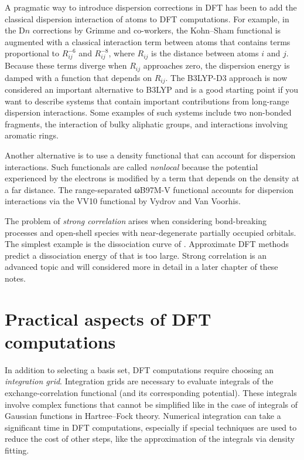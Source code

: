 \documentclass[../Main/chem371-notes.tex]{subfiles}
\begin{document}
A pragmatic way to introduce dispersion corrections in DFT has been to add the classical dispersion interaction of atoms to DFT computations.
For example, in the D$n$ corrections by Grimme and co-workers, the Kohn--Sham functional is augmented with a classical interaction term between atoms that contains terms proportional to $R_{ij}^{-6}$ and $R_{ij}^{-8}$, where $R_{ij}$ is the distance between atoms $i$ and $j$.
Because these terms diverge when $R_{ij}$ approaches zero, the dispersion energy is damped with a function that depends on $R_{ij}$.
The B3LYP-D3 approach is now considered an important alternative to B3LYP and is a good starting point if you want to describe systems that contain important contributions from long-range dispersion interactions.
Some examples of such systems include two non-bonded fragments, the interaction of bulky aliphatic groups, and interactions involving aromatic rings.

Another alternative is to use a density functional that can account for dispersion interactions.
Such functionals are called \emph{nonlocal} because the potential experienced by the electrons is modified by a term that depends on the density at a far distance.
The range-separated ωB97M-V functional accounts for dispersion interactions via the VV10 functional by Vydrov and Van Voorhis.

The problem of \emph{strong correlation} arises when considering bond-breaking processes and open-shell species with near-degenerate partially occupied orbitals.
The simplest example is the dissociation curve of .
Approximate DFT methods predict a dissociation energy of  that is too large.
Strong correlation is an advanced topic and will considered more in detail in a later chapter of these notes.

\section{Practical aspects of DFT computations}

In addition to selecting a basis set, DFT computations require choosing an \emph{integration grid}.
Integration grids are necessary to evaluate integrals of the exchange-correlation functional (and its corresponding potential).
These integrals involve complex functions that cannot be simplified like in the case of integrals of Gaussian functions in Hartree--Fock theory.
Numerical integration can take a significant time in DFT computations, especially if special techniques are used to reduce the cost of other steps, like the approximation of the integrals via density fitting.
\end{document}
